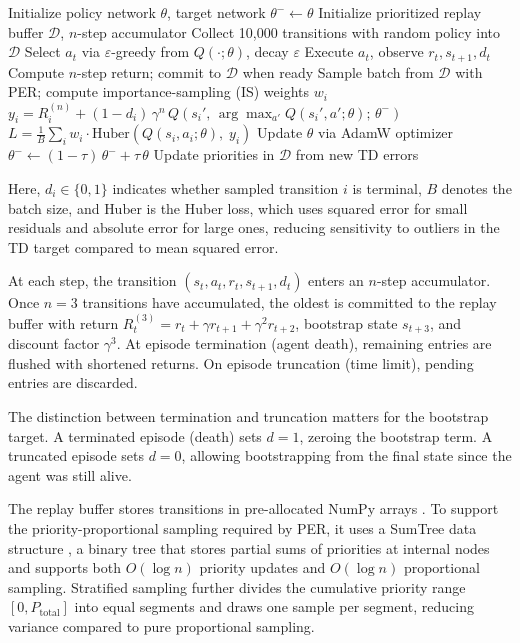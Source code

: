 \documentclass[12pt,a4paper,titlepage]{article}
\begin{document}
\begin{algorithm}[h]
\caption{Rainbow-lite DQN training.}
\label{alg:training}
\begin{algorithmic}[1]
\State Initialize policy network $\theta$, target network $\theta^- \leftarrow \theta$
\State Initialize prioritized replay buffer $\mathcal{D}$, $n$-step accumulator
\State Collect 10{,}000 transitions with random policy into $\mathcal{D}$
    \State Select $a_t$ via $\varepsilon$-greedy from $Q(\cdot; \theta)$, decay $\varepsilon$
    \State Execute $a_t$, observe $r_t, s_{t+1}, d_t$
    \State Compute $n$-step return; commit to $\mathcal{D}$ when ready
    \State Sample batch from $\mathcal{D}$ with PER; compute importance-sampling (IS) weights $w_i$
    \State $y_i = R_i^{(n)} + (1 - d_i)\,\gamma^n\, Q\!\left(s_i',\, \arg\max_{a'} Q(s_i', a'; \theta);\, \theta^-\right)$
    \State $L = \frac{1}{B}\sum_i w_i \cdot \text{Huber}(Q(s_i, a_i; \theta),\; y_i)$
    \State Update $\theta$ via AdamW optimizer
    \State $\theta^- \leftarrow (1-\tau)\,\theta^- + \tau\,\theta$
    \State Update priorities in $\mathcal{D}$ from new TD errors
\EndFor
\end{algorithmic}
\end{algorithm}
Here, $d_i \in \{0,1\}$ indicates whether sampled transition $i$ is terminal, $B$ denotes the batch size, and $\text{Huber}$ is the Huber loss, which uses squared error for small residuals and absolute error for large ones, reducing sensitivity to outliers in the TD target compared to mean squared error.

At each step, the transition $(s_t, a_t, r_t, s_{t+1}, d_t)$ enters an $n$-step accumulator. Once $n = 3$ transitions have accumulated, the oldest is committed to the replay buffer with return $R_t^{(3)} = r_t + \gamma r_{t+1} + \gamma^2 r_{t+2}$, bootstrap state $s_{t+3}$, and discount factor $\gamma^3$. At episode termination (agent death), remaining entries are flushed with shortened returns. On episode truncation (time limit), pending entries are discarded.

The distinction between termination and truncation matters for the bootstrap target. A terminated episode (death) sets $d = 1$, zeroing the bootstrap term. A truncated episode sets $d = 0$, allowing bootstrapping from the final state since the agent was still alive.

The replay buffer stores transitions in pre-allocated NumPy arrays \citep{Harris2020}. To support the priority-proportional sampling required by PER, it uses a SumTree data structure \citep{Schaul2016}, a binary tree that stores partial sums of priorities at internal nodes and supports both $O(\log n)$ priority updates and $O(\log n)$ proportional sampling. Stratified sampling further divides the cumulative priority range $[0, P_\text{total}]$ into equal segments and draws one sample per segment, reducing variance compared to pure proportional sampling.
\end{document}
